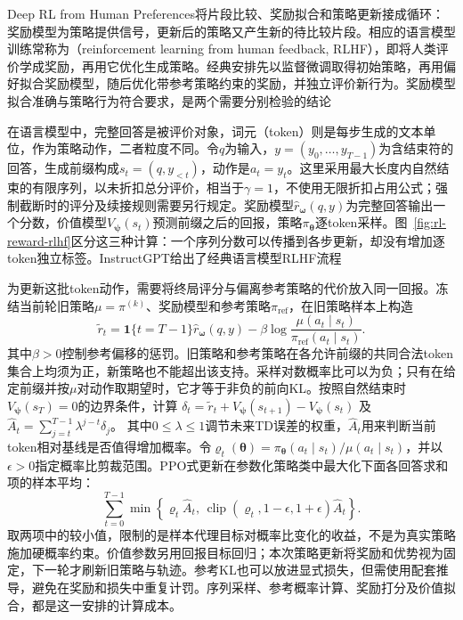 Deep RL from Human Preferences将片段比较、奖励拟合和策略更新接成循环：奖励模型为策略提供信号，更新后的策略又产生新的待比较片段。相应的语言模型训练常称为（reinforcement learning from human feedback, RLHF），即将人类评价学成奖励，再用它优化生成策略。经典安排先以监督微调取得初始策略，再用偏好拟合奖励模型，随后优化带参考策略约束的奖励，并独立评价新行为。奖励模型拟合准确与策略行为符合要求，是两个需要分别检验的结论

在语言模型中，完整回答是被评价对象，词元（token）则是每步生成的文本单位，作为策略动作，二者粒度不同。令$q$为输入，$y=(y_0,\ldots,y_{T-1})$为含结束符的回答，生成前缀构成$s_t=(q,y_{<t})$，动作是$a_t=y_t$。这里采用最大长度内自然结束的有限序列，以未折扣总分评价，相当于$\gamma=1$，不使用无限折扣占用公式；强制截断时的评分及续接规则需要另行规定。奖励模型$\widehat r_{\bm{\omega}}(q,y)$为完整回答输出一个分数，价值模型$V_{\bm{\psi}}(s_t)$预测前缀之后的回报，策略$\pi_{\bm{\theta}}$逐token采样。图~\ref{fig:rl-reward-rlhf}区分这三种计算：一个序列分数可以传播到各步更新，却没有增加逐token独立标签。InstructGPT给出了经典语言模型RLHF流程

为更新这批token动作，需要将终局评分与偏离参考策略的代价放入同一回报。冻结当前轮旧策略$\mu=\pi^{(k)}$、奖励模型和参考策略$\pi_{\mathrm{ref}}$，在旧策略样本上构造
\begin{equation}
  \widetilde r_t
  =\mathbf1\{t=T-1\}\widehat r_{\bm{\omega}}(q,y)
  -\beta\log\frac{\mu(a_t\mid s_t)}
                      {\pi_{\mathrm{ref}}(a_t\mid s_t)}.
  \label{eq:rl-reward-token-reward}
\end{equation}
其中$\beta>0$控制参考偏移的惩罚。旧策略和参考策略在各允许前缀的共同合法token集合上均须为正，新策略也不能超出该支持。采样对数概率比可以为负；只有在给定前缀并按$\mu$对动作取期望时，它才等于非负的前向KL。按照自然结束时$V_{\bm{\psi}}(s_T)=0$的边界条件，计算
$\delta_t=\widetilde r_t+V_{\bm{\psi}}(s_{t+1})-V_{\bm{\psi}}(s_t)$
及$\widehat A_t=\sum_{j=t}^{T-1}\lambda^{j-t}\delta_j$。
其中$0\leq\lambda\leq1$调节未来TD误差的权重，$\widehat A_t$用来判断当前token相对基线是否值得增加概率。令$\varrho_t(\bm{\theta})=\pi_{\bm{\theta}}(a_t\mid s_t)/\mu(a_t\mid s_t)$，并以$\epsilon>0$指定概率比剪裁范围。PPO式更新在参数化策略类中最大化下面各回答求和项的样本平均：
\begin{equation}
  \sum_{t=0}^{T-1}
  \min\!\left\{\varrho_t\widehat A_t,\,
  \operatorname{clip}(\varrho_t,1-\epsilon,1+\epsilon)\widehat A_t\right\}.
  \label{eq:rl-reward-ppo}
\end{equation}
取两项中的较小值，限制的是样本代理目标对概率比变化的收益，不是为真实策略施加硬概率约束。价值参数另用回报目标回归；本次策略更新将奖励和优势视为固定，下一轮才刷新旧策略与轨迹。参考KL也可以放进显式损失，但需使用配套推导，避免在奖励和损失中重复计罚。序列采样、参考概率计算、奖励打分及价值拟合，都是这一安排的计算成本。

